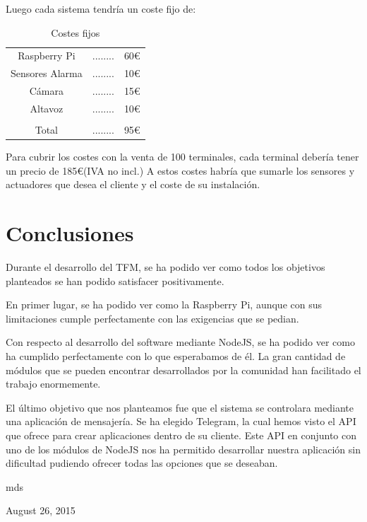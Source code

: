 \documentclass[10pt,journal,compsoc]{IEEEtran}
\begin{document}
Luego cada sistema tendría un coste fijo de:
\begin{table}[h]
\centering
\begin{tabular}{ccc}
Raspberry Pi & ........ & 60\euro \\
Sensores Alarma & ........ & 10\euro \\
Cámara & ........ & 15\euro \\
Altavoz & ........ & 10\euro \\
\hline \\
Total & ........ & 95\euro \\
\end{tabular} 
\caption{Costes fijos}
\label{tab:CostesFij}
\end{table}

Para cubrir los costes con la venta de 100 terminales, cada terminal debería tener un precio de 
185\euro (IVA no incl.)
A estos costes habría que sumarle los sensores y actuadores que desea el cliente y el coste 
de su instalación.

\section{Conclusiones}
Durante el desarrollo del TFM, se ha podido ver como todos los objetivos 
planteados se han podido satisfacer positivamente.

En primer lugar, se ha podido ver como la Raspberry Pi, aunque con sus 
limitaciones cumple perfectamente con las exigencias que se pedian.

Con respecto al desarrollo del software mediante NodeJS, se ha podido ver como 
ha cumplido perfectamente con lo que esperabamos de él. La gran cantidad de 
módulos que se pueden encontrar desarrollados por la comunidad han facilitado el 
trabajo enormemente.

El último objetivo que nos planteamos fue que el sistema se controlara mediante 
una aplicación de mensajería. Se ha elegido Telegram, la cual hemos visto el API 
que ofrece para crear aplicaciones dentro de su cliente. Este API en conjunto 
con uno de los módulos de NodeJS nos ha permitido desarrollar nuestra aplicación 
sin dificultad pudiendo ofrecer todas las opciones que se deseaban.

\hfill mds
 
\hfill August 26, 2015

\end{document}
